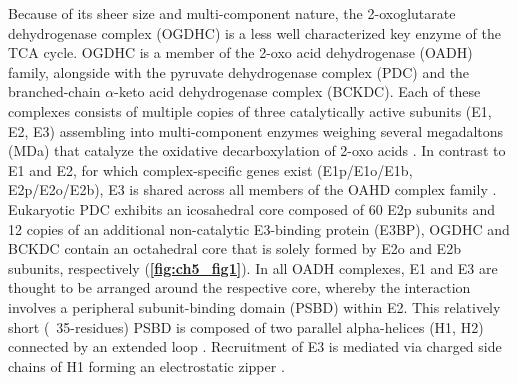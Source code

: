 Because of its sheer size and multi-component nature, the 2-oxoglutarate dehydrogenase complex (OGDHC) is a less well characterized key enzyme of the TCA cycle. OGDHC is a member of the 2-oxo acid dehydrogenase (OADH) family, alongside with the pyruvate dehydrogenase complex (PDC) and the branched-chain $\alpha$-keto acid dehydrogenase complex (BCKDC). Each of these complexes consists of multiple copies of three catalytically active subunits (E1, E2, E3) assembling into multi-component enzymes weighing several megadaltons (MDa) that catalyze the oxidative decarboxylation of 2-oxo acids \cite{Reed_2001, Zhong_2022}. In contrast to E1 and E2, for which complex-specific genes exist (E1p/E1o/E1b, E2p/E2o/E2b), E3 is shared across all members of the OAHD complex family \cite{Nemeria_2021}. Eukaryotic PDC exhibits an icosahedral core composed of 60 E2p subunits and 12 copies of an additional non-catalytic E3-binding protein (E3BP), OGDHC and BCKDC contain an octahedral core that is solely formed by E2o and E2b subunits, respectively (\textbf{\autoref{fig:ch5_fig1}}). In all OADH complexes, E1 and E3 are thought to be arranged around the respective core, whereby the interaction involves a peripheral subunit-binding domain (PSBD) within E2. This relatively short (~35-residues) PSBD is composed of two parallel alpha-helices (H1, H2) connected by an extended loop \cite{Robien_1992}. Recruitment of E3 is mediated via charged side chains of H1 forming an electrostatic zipper \cite{Mande_1996}.

